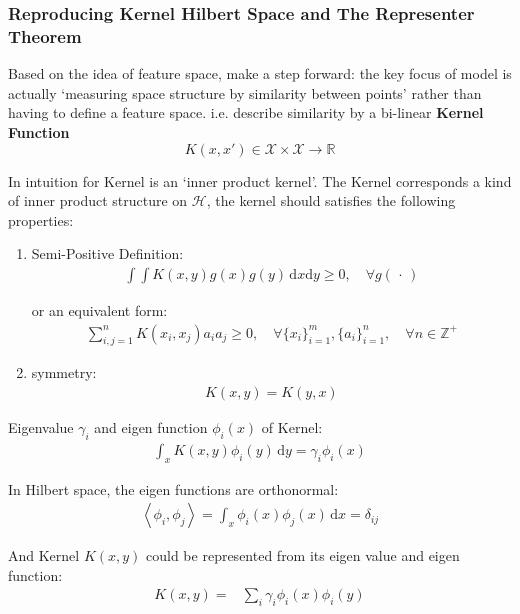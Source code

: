\subsubsection{Reproducing Kernel Hilbert Space and The Representer Theorem}

    Based on the idea of feature space, make a step forward: the key focus of model is actually `measuring space structure by similarity between points' rather than having to define a feature space. i.e. describe similarity by a bi-linear \textbf{Kernel Function} 
    \[
        K(x,x') \in \mathcal{X}\times \mathcal{X}\to \mathbb{R}
    \]

    In intuition for Kernel is an `inner product kernel'. The Kernel corresponds a kind of inner product structure on $ \mathcal{H} $, the kernel should satisfies the following properties:
\begin{enumerate}[topsep=2pt,itemsep=2pt]
    \item Semi-Positive Definition:
    \begin{align}
        \int\int K(x,y)g(x)g(y)\,\mathrm{d}x\mathrm{d}y\geq 0,\quad \forall g(\,\cdot\,)
    \end{align}
    
    or an equivalent form:
    \begin{align}
        \sum_{i,j=1}^n K(x_i,x_j)a_ia_j\geq 0,\quad \forall \{x_i\}_{i=1}^m,\{a_i\}_{i=1}^n,\quad \forall n\in\mathbb{Z}^+ 
    \end{align}
    \item symmetry:
    \begin{align}
        K(x,y)=K(y,x) 
    \end{align}
\end{enumerate}



Eigenvalue $ \gamma _i $ and eigen function $ \phi _i(x) $ of Kernel:
\begin{align}
     \int_x K(x,y) \phi _i(y)\,\mathrm{d}y=\gamma _i\phi_i(x)
\end{align}

    In Hilbert space, the eigen functions are orthonormal:
    \begin{align}
         \left\langle \phi _i,\phi _j\right\rangle = \int _x\phi _i(x)\phi _j(x) \,\mathrm{d}x =\delta _{ij}
    \end{align}

    And Kernel $ K(x,y) $ could be represented from its eigen value and eigen function:
    \begin{align}
        K(x,y)=&\sum_{i}\gamma _i\phi _i(x)\phi _i(y)
    \end{align}

